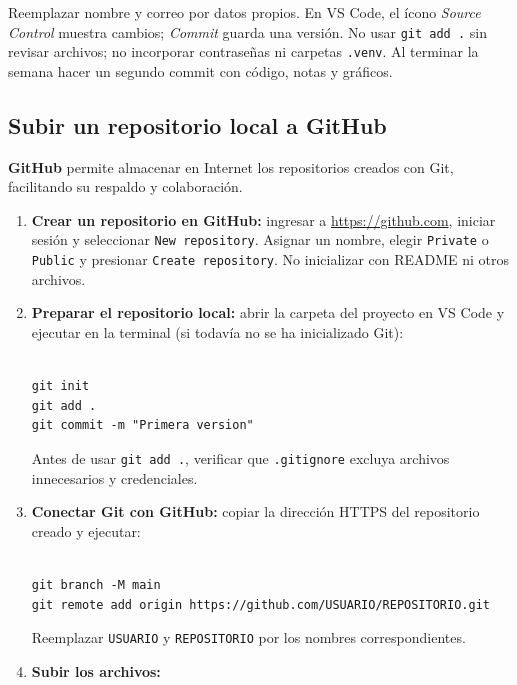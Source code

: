 \documentclass[11pt,a4paper]{article}
\begin{document}
Reemplazar nombre y correo por datos propios. En VS Code, el ícono \emph{Source Control} muestra cambios; \emph{Commit} guarda una versión. No usar \texttt{git add .} sin revisar archivos; no incorporar contraseñas ni carpetas \texttt{.venv}. Al terminar la semana hacer un segundo commit con código, notas y gráficos.

\subsection{Subir un repositorio local a GitHub}

\textbf{GitHub} permite almacenar en Internet los repositorios
creados con Git, facilitando su respaldo y colaboración.

\begin{enumerate}

    \item \textbf{Crear un repositorio en GitHub:}
    ingresar a \url{https://github.com}, iniciar sesión
    y seleccionar \texttt{New repository}. Asignar un nombre,
    elegir \texttt{Private} o \texttt{Public} y presionar
    \texttt{Create repository}. No inicializar con README
    ni otros archivos.

    \item \textbf{Preparar el repositorio local:}
    abrir la carpeta del proyecto en VS Code y ejecutar
    en la terminal (si todavía no se ha inicializado Git):

    \begin{verbatim}

git init
git add .
git commit -m "Primera version"
\end{verbatim}

    Antes de usar \texttt{git add .}, verificar que
    \texttt{.gitignore} excluya archivos innecesarios
    y credenciales.

    \item \textbf{Conectar Git con GitHub:}
    copiar la dirección HTTPS del repositorio creado
    y ejecutar:

    \begin{verbatim}

git branch -M main
git remote add origin https://github.com/USUARIO/REPOSITORIO.git
\end{verbatim}

    Reemplazar \texttt{USUARIO} y \texttt{REPOSITORIO}
    por los nombres correspondientes.

    \item \textbf{Subir los archivos:}


\end{enumerate}
\end{document}
